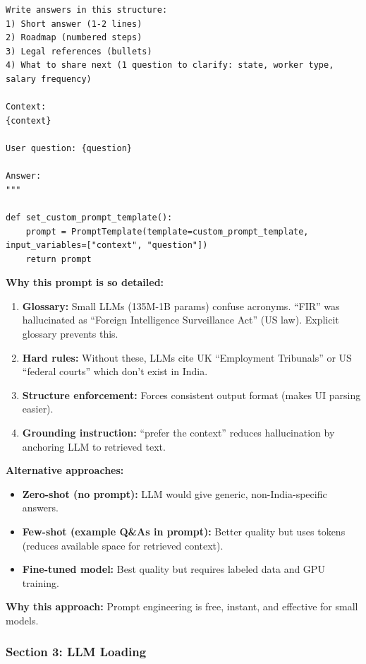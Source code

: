 \documentclass[11pt,a4paper]{article}
\begin{document}
\begin{lstlisting}
Write answers in this structure:
1) Short answer (1-2 lines)
2) Roadmap (numbered steps)
3) Legal references (bullets)
4) What to share next (1 question to clarify: state, worker type, salary frequency)

Context:
{context}

User question: {question}

Answer:
"""

def set_custom_prompt_template():
    prompt = PromptTemplate(template=custom_prompt_template, input_variables=["context", "question"])
    return prompt
\end{lstlisting}

\textbf{Why this prompt is so detailed:}
\begin{enumerate}
\item \textbf{Glossary:} Small LLMs (135M-1B params) confuse acronyms. ``FIR'' was hallucinated as ``Foreign Intelligence Surveillance Act'' (US law). Explicit glossary prevents this.
\item \textbf{Hard rules:} Without these, LLMs cite UK ``Employment Tribunals'' or US ``federal courts'' which don't exist in India.
\item \textbf{Structure enforcement:} Forces consistent output format (makes UI parsing easier).
\item \textbf{Grounding instruction:} ``prefer the context'' reduces hallucination by anchoring LLM to retrieved text.
\end{enumerate}

\textbf{Alternative approaches:}
\begin{itemize}
\item \textbf{Zero-shot (no prompt):} LLM would give generic, non-India-specific answers.
\item \textbf{Few-shot (example Q\&As in prompt):} Better quality but uses tokens (reduces available space for retrieved context).
\item \textbf{Fine-tuned model:} Best quality but requires labeled data and GPU training.
\end{itemize}

\textbf{Why this approach:} Prompt engineering is free, instant, and effective for small models.

\subsubsection{Section 3: LLM Loading}
\end{document}
